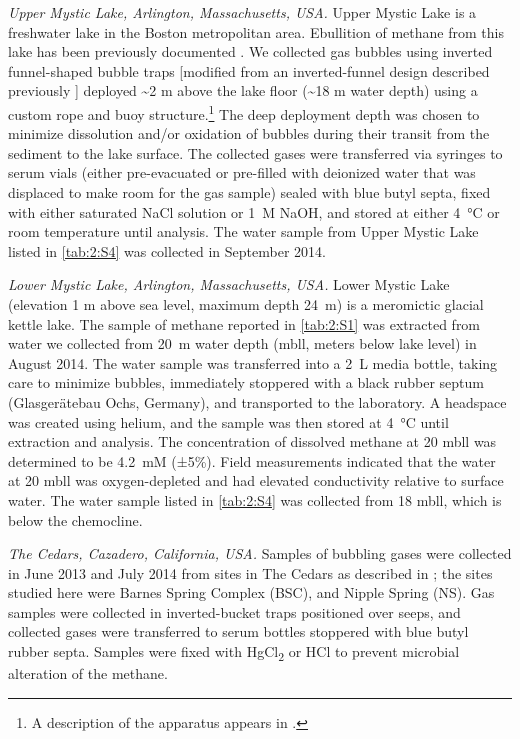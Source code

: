 \emph{Upper Mystic Lake, Arlington, Massachusetts, USA.} Upper Mystic
Lake is a freshwater lake in the Boston metropolitan area. Ebullition of
methane from this lake has been previously documented \parencite{Varadharajan+Hemond_2012_JGR,Scandella++_2011_GRL}. We collected gas bubbles using inverted funnel-shaped bubble
traps {[}modified from an inverted-funnel design described previously
\parencite{Varadharajan+Hemond_2012_JGR,Varadharajan++_2010_LOM}{]} deployed \textasciitilde{}2 m above the lake
floor (\textasciitilde{}18 m water depth) using a custom rope and buoy
structure.\footnote{A description of the apparatus appears in \textcite{Delwiche++_2015_LOM}.} The deep deployment depth was chosen to minimize dissolution
and/or oxidation of bubbles during their transit from the sediment to
the lake surface. The collected gases were transferred via syringes to
serum vials (either pre-evacuated or pre-filled with deionized water
that was displaced to make room for the gas sample) sealed with blue
butyl septa, fixed with either saturated NaCl solution or 1~M NaOH, and
stored at either 4~°C or room temperature until analysis. The water
sample from Upper Mystic Lake listed in \autoref{tab:2:S4} was collected in
September 2014.

\emph{Lower Mystic Lake, Arlington, Massachusetts, USA.} Lower Mystic
Lake (elevation 1 m above sea level, maximum depth 24~m) is a meromictic
glacial kettle lake. The sample of methane reported in \autoref{tab:2:S1} was
extracted from water we collected from 20~m water depth (mbll, meters
below lake level) in August 2014. The water sample was transferred into
a 2~L media bottle, taking care to minimize bubbles, immediately
stoppered with a black rubber septum (Glasgerätebau Ochs, Germany), and
transported to the laboratory. A headspace was created using helium, and
the sample was then stored at 4~°C until extraction and analysis. The
concentration of dissolved methane at 20 mbll was determined to be
4.2~mM (±5\%). Field measurements indicated that the water at 20 mbll
was oxygen-depleted and had elevated conductivity relative to surface
water. The water sample listed in \autoref{tab:2:S4} was collected from 18 mbll,
which is below the chemocline.

\emph{The Cedars, Cazadero, California, USA.} Samples of bubbling gases
were collected in June 2013 and July 2014 from sites in The Cedars as
described in \textcite{Morrill++_2013_GCA}; the sites studied here were
Barnes Spring Complex (BSC), and Nipple Spring (NS). Gas samples were
collected in inverted-bucket traps positioned over seeps, and collected
gases were transferred to serum bottles stoppered with blue butyl rubber
septa. Samples were fixed with HgCl\textsubscript{2} or HCl to prevent
microbial alteration of the methane.

